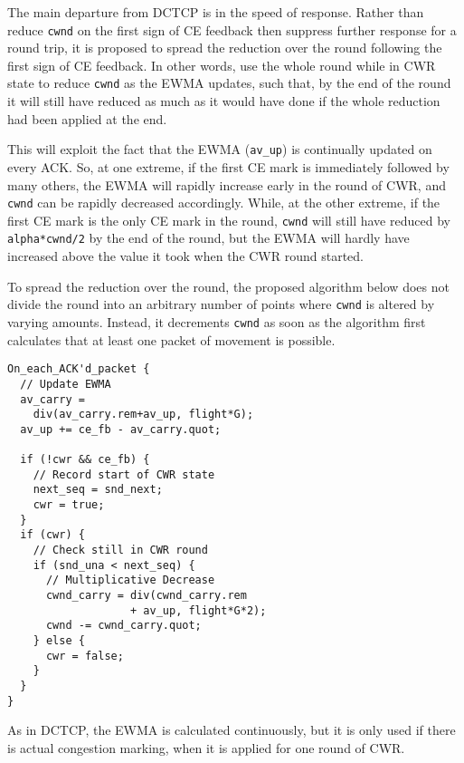 The main departure from DCTCP is in the speed of response. Rather than reduce 
\texttt{cwnd} on the first sign of CE feedback then suppress further response
for a round trip, it is proposed to spread the reduction over the round
following the first sign of CE feedback. In other words, use the whole round
while in CWR state to reduce \texttt{cwnd} as the EWMA updates, such that, by
the end of the round it will still have reduced as much as it would have done if
the whole reduction had been applied at the end. 

This will exploit the fact that the EWMA (\texttt{av\_up}) is continually
updated on every ACK. So, at one extreme, if the first CE mark is immediately
followed by many others, the EWMA will rapidly increase early in the round of
CWR, and \texttt{cwnd} can be rapidly decreased accordingly. While, at the other
extreme, if the first CE mark is the only CE mark in the round, \texttt{cwnd}
will still have reduced by \texttt{alpha*cwnd/2} by the end of the round, but
the EWMA will hardly have increased above the value it took when the CWR round
started. 

To spread the reduction over the round, the proposed algorithm below does not
divide the round into an arbitrary number of points where \texttt{cwnd} is
altered by varying amounts. Instead, it decrements \texttt{cwnd} as soon as the
algorithm first calculates that at least one packet of movement is possible. 

\begin{verbatim}
On_each_ACK'd_packet {
  // Update EWMA
  av_carry = 
    div(av_carry.rem+av_up, flight*G);
  av_up += ce_fb - av_carry.quot;

  if (!cwr && ce_fb) {
    // Record start of CWR state
    next_seq = snd_next;
    cwr = true;
  }
  if (cwr) {
    // Check still in CWR round
    if (snd_una < next_seq) {
      // Multiplicative Decrease
      cwnd_carry = div(cwnd_carry.rem 
                   + av_up, flight*G*2);
      cwnd -= cwnd_carry.quot;
    } else {
      cwr = false;
    }
  }
}
\end{verbatim}

As in DCTCP, the EWMA is calculated continuously, but it is only used if there
is actual congestion marking, when it is applied for one round of CWR. %

